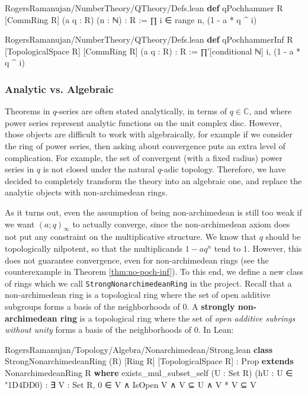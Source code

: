 \documentclass[12pt]{amsart}
\theoremstyle{definition}
\theoremstyle{remark}
\numberwithin{equation}{subsection}
\newcommand{\C}{\mathbb C}
\newcommand{\nhds}{{\char"1D4DD}}
\newcommand{\kw}[1]{\textcolor{keywordcolor}{\textbf{#1}}}
\newcommand{\var}[1]{\textcolor{tacticcolor}{#1}}
\newcommand{\num}[1]{\textcolor{numcolor}{#1}}
\newcommand{\imp}[1]{\textcolor{commentcolor}{\textbraceleft#1\textbraceright}}
\begin{document}
\begin{code}{RogersRamanujan/NumberTheory/QTheory/Defs.lean}
\kw{def} qPochhammer \imp{R} [CommRing \var{R}] (\var{a} \var{q} : \var{R}) (\var{n} : ℕ) : \var{R} :=
  ∏ \var{i} ∈ range \var{n}, (\num{1} - \var{a} * \var{q} ^ \var{i})
\end{code}

\begin{code}{RogersRamanujan/NumberTheory/QTheory/Defs.lean}
\kw{def} qPochhammerInf \imp{R} [TopologicalSpace \var{R}] [CommRing \var{R}] (\var{a} \var{q} : \var{R}) : \var{R} :=
  ∏'[conditional ℕ] \var{i}, (\num{1} - \var{a} * \var{q} ^ \var{i})
\end{code}

\subsubsection{Analytic vs. Algebraic}

Theorems in $q$-series are often stated analytically, in terms of $q \in \C$, and where power series represent analytic functions on the unit complex disc. However, those objects are difficult to work with algebraically, for example if we consider the ring of power series, then asking about convergence puts an extra level of complication. For example, the set of convergent (with a fixed radius) power series in $q$ is not closed under the natural $q$-adic topology. Therefore, we have decided to completely transform the theory into an algebraic one, and replace the analytic objects with non-archimedean rings.


As it turns out, even the assumption of being non-archimedean is still too weak if we want $(a; q)_\infty$ to actually converge, since the non-archimedean axiom does not put any constraint on the multiplicative structure. We know that $q$ should be topologically nilpotent, so that the multiplicands $1 - aq^n$ tend to $1$. However, this does not guarantee convergence, even for non-archimedean rings (see the counterexample in Theorem \ref{thm:no-poch-inf}). To this end, we define a new class of rings which we call  \texttt{StrongNonarchimedeanRing} in the project. Recall that a non-archimedean ring is a topological ring where the set of open additive subgroups forms a basis of the neighborhoods of $0$. A \textbf{strongly non-archimedean ring} is a topological ring where the set of \textit{open additive subrings without unity} forms a basis of the neighborhoods of $0$. In Lean:

\begin{code}{RogersRamanujan/Topology/Algebra/Nonarchimedean/Strong.lean}
\kw{class} StrongNonarchimedeanRing (\var{R}) [Ring \var{R}] [TopologicalSpace \var{R}] :
    Prop \kw{extends} NonarchimedeanRing \var{R} \kw{where}
  exists_mul_subset_self (\var{U} : Set \var{R}) (\var{hU} : \var{U} ∈ \nhds \num{0}) :
    ∃ \var{V} : Set \var{R}, \num{0} ∈ \var{V} ∧ IsOpen \var{V} ∧ \var{V} ⊆ \var{U} ∧ \var{V} * \var{V} ⊆ \var{V}
\end{code}
\end{document}
